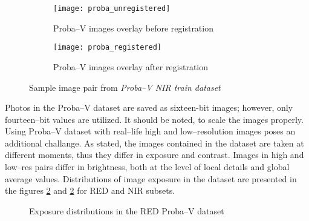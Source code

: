 \begin{figure}
    \begin{subfigure}{0.45\textwidth}
        \centering
        \texttt{[image: proba\_unregistered]}
        \caption{Proba--V images overlay before registration}
    \end{subfigure}
    \hfill
    \begin{subfigure}{0.45\textwidth}
        \centering
        \texttt{[image: proba\_registered]}
        \caption{Proba--V images overlay after registration}
    \end{subfigure}
    \caption{Sample image pair from \textit{Proba--V NIR train dataset}}
    \label{fig:proba-registration}
\end{figure}

Photos in the Proba--V dataset are saved as sixteen-bit images; however, only fourteen--bit values are utilized.
It should be noted, to scale the images properly.
Using Proba--V dataset with real--life high and low--resolution images poses an additional challange.
As stated, the images contained in the dataset are taken at different moments, thus they differ in exposure and contrast.
Images in high and low--res pairs differ in brightness, both at the level of local details and global average values.
Distributions of image exposure in the dataset are presented in the figures \ref{fig:exposure-dist-red} and \ref{fig:exposure-dist-red} for RED and NIR subsets.
\begin{figure}
        \centering
    \caption{Exposure distributions in the RED Proba--V dataset}
    \label{fig:exposure-dist-red}
\end{figure}
